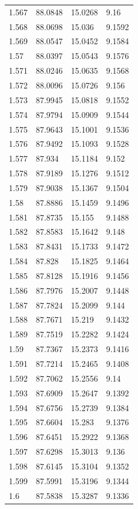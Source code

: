 \begin{tabular}{llll}
1.567 & 88.0848 & 15.0268 & 9.16 \\
1.568 & 88.0698 & 15.036 & 9.1592 \\
1.569 & 88.0547 & 15.0452 & 9.1584 \\
1.57 & 88.0397 & 15.0543 & 9.1576 \\
1.571 & 88.0246 & 15.0635 & 9.1568 \\
1.572 & 88.0096 & 15.0726 & 9.156 \\
1.573 & 87.9945 & 15.0818 & 9.1552 \\
1.574 & 87.9794 & 15.0909 & 9.1544 \\
1.575 & 87.9643 & 15.1001 & 9.1536 \\
1.576 & 87.9492 & 15.1093 & 9.1528 \\
1.577 & 87.934 & 15.1184 & 9.152 \\
1.578 & 87.9189 & 15.1276 & 9.1512 \\
1.579 & 87.9038 & 15.1367 & 9.1504 \\
1.58 & 87.8886 & 15.1459 & 9.1496 \\
1.581 & 87.8735 & 15.155 & 9.1488 \\
1.582 & 87.8583 & 15.1642 & 9.148 \\
1.583 & 87.8431 & 15.1733 & 9.1472 \\
1.584 & 87.828 & 15.1825 & 9.1464 \\
1.585 & 87.8128 & 15.1916 & 9.1456 \\
1.586 & 87.7976 & 15.2007 & 9.1448 \\
1.587 & 87.7824 & 15.2099 & 9.144 \\
1.588 & 87.7671 & 15.219 & 9.1432 \\
1.589 & 87.7519 & 15.2282 & 9.1424 \\
1.59 & 87.7367 & 15.2373 & 9.1416 \\
1.591 & 87.7214 & 15.2465 & 9.1408 \\
1.592 & 87.7062 & 15.2556 & 9.14 \\
1.593 & 87.6909 & 15.2647 & 9.1392 \\
1.594 & 87.6756 & 15.2739 & 9.1384 \\
1.595 & 87.6604 & 15.283 & 9.1376 \\
1.596 & 87.6451 & 15.2922 & 9.1368 \\
1.597 & 87.6298 & 15.3013 & 9.136 \\
1.598 & 87.6145 & 15.3104 & 9.1352 \\
1.599 & 87.5991 & 15.3196 & 9.1344 \\
1.6 & 87.5838 & 15.3287 & 9.1336 \\

\end{tabular}
